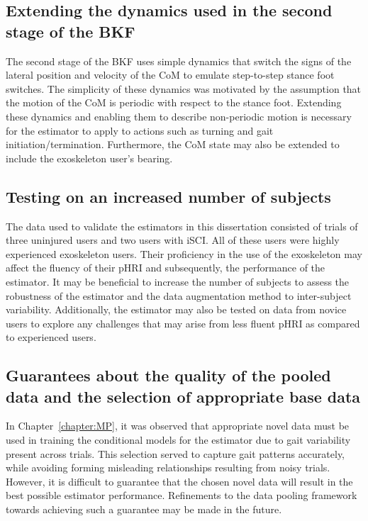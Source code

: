 \subsection{Extending the dynamics used in the second stage of the BKF}

The second stage of the BKF uses simple dynamics that switch the signs of the lateral position and velocity of the CoM to emulate step-to-step stance foot switches. The simplicity of these dynamics was motivated by the assumption that the motion of the CoM is periodic with respect to the stance foot. Extending these dynamics and enabling them to describe non-periodic motion is necessary for the estimator to apply to actions such as turning and gait initiation/termination. Furthermore, the CoM state may also be extended to include the exoskeleton user's bearing.

\subsection{Testing on an increased number of subjects}

The data used to validate the estimators in this dissertation consisted of trials of three uninjured users and two users with iSCI. All of these users were highly experienced exoskeleton users. Their proficiency in the use of the exoskeleton may affect the fluency of their pHRI and subsequently, the performance of the estimator. It may be beneficial to increase the number of subjects to assess the robustness of the estimator and the data augmentation method to inter-subject variability. Additionally, the estimator may also be tested on data from novice users to explore any challenges that may arise from less fluent pHRI as compared to experienced users.

\subsection{Guarantees about the quality of the pooled data and the selection of appropriate base data}

In Chapter~\ref{chapter:MP}, it was observed that appropriate novel data must be used in training the conditional models for the estimator due to gait variability present across trials. This selection served to capture gait patterns accurately, while avoiding forming misleading relationships resulting from noisy trials. However, it is difficult to guarantee that the chosen novel data will result in the best possible estimator performance. Refinements to the data pooling framework towards achieving such a guarantee may be made in the future.


